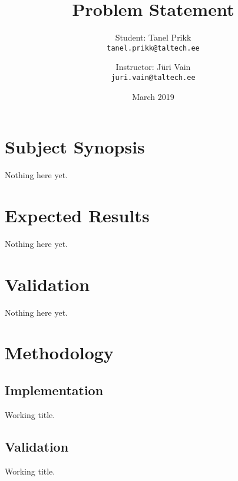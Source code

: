 \documentclass[12pt,oneside,a4paper,draft,notitlepage]{article}
\title{Problem Statement}
\author{
	Student: Tanel Prikk\\
	\texttt{tanel.prikk@taltech.ee}
	\and
	Instructor: Jüri Vain\\
	\texttt{juri.vain@taltech.ee}
}
\date{March 2019}
\begin{document}
	\maketitle
	\section*{Subject Synopsis}
	Nothing here yet.
	\section*{Expected Results}
	Nothing here yet. \cite{dirac}
	\section*{Validation}
	Nothing here yet.
	\section*{Methodology}
	\subsection*{Implementation}
	Working title.
	\subsection*{Validation}
	Working title.

	\printbibliography[
		title=Sources
	]
\end{document}
